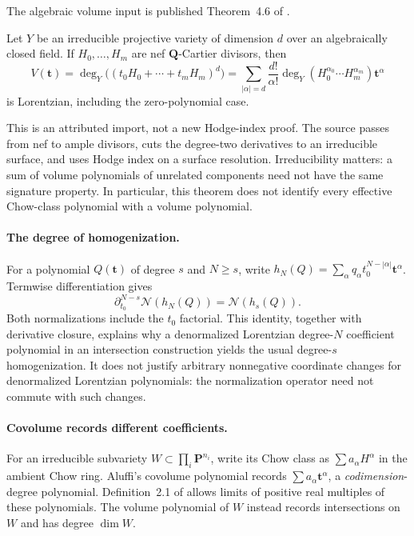 The algebraic volume input is published Theorem~4.6 of
\cite{BrandenHuh20Lorentzian}.
\begin{theorem}
\label{thm:appD-nef-volume-Lorentzian}
Let $Y$ be an irreducible projective variety of dimension $d$
over an algebraically closed field. If $H_0,\ldots,H_m$ are
nef $\mathbf Q$-Cartier divisors, then
\[
 V(\mathbf t)
   =\deg_Y\bigl((t_0H_0+\cdots+t_mH_m)^d\bigr)
   =\sum_{|\alpha|=d}\frac{d!}{\alpha!}
       \deg_Y(H_0^{\alpha_0}\cdots H_m^{\alpha_m})\mathbf t^\alpha
\tag{D.33}\label{eq:appD-nef-volume-polynomial}
\]
is Lorentzian, including the zero-polynomial case.
\end{theorem}

This is an attributed import, not a new Hodge-index proof.
The source passes from nef to ample divisors, cuts the
degree-two derivatives to an irreducible surface, and uses
Hodge index on a surface resolution. Irreducibility matters:
a sum of volume polynomials of unrelated components need not
have the same signature property. In particular, this theorem
does not identify every effective Chow-class polynomial with
a volume polynomial.

\paragraph{The degree of homogenization.}
For a polynomial $Q(\mathbf t)$ of degree $s$ and $N\geq s$,
write $h_N(Q)=\sum_\alpha q_\alpha
t_0^{N-|\alpha|}\mathbf t^\alpha$. Termwise differentiation gives
\[
 \partial_{t_0}^{N-s}\mathcal N(h_N(Q))
     =\mathcal N(h_s(Q)).
\tag{D.34}\label{eq:appD-homogenization-derivative}
\]
Both normalizations include the $t_0$ factorial. This identity,
together with derivative closure, explains why a denormalized
Lorentzian degree-$N$ coefficient polynomial in an intersection
construction yields the usual degree-$s$ homogenization.
It does not justify arbitrary nonnegative coordinate changes
for denormalized Lorentzian polynomials: the normalization
operator need not commute with such changes.

\paragraph{Covolume records different coefficients.}
For an irreducible subvariety $W\subset\prod_i\mathbf P^{n_i}$,
write its Chow class as $\sum a_\alpha H^\alpha$ in the
ambient Chow ring. Aluffi's covolume polynomial records
$\sum a_\alpha\mathbf t^\alpha$, a \emph{codimension}-degree
polynomial. Definition~2.1 of \cite{Aluffi23CovolumeV4}
allows limits of positive real multiples of these polynomials.
The volume polynomial of $W$ instead records intersections
on $W$ and has degree $\dim W$.

